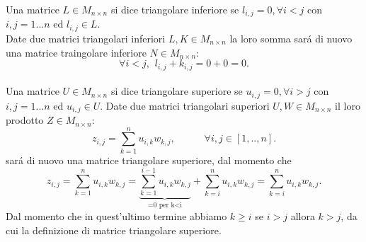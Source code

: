 Una matrice \( L \in M_{n \times n} \) si dice triangolare inferiore se \( l_{i,j}=0, \forall i<j \) con \(i,j = 1...n \) ed \( l_{i,j} \in L \).
\\
Date due matrici triangolari inferiori \( L,K \in M_{n \times n} \) la loro somma sar\'a di nuovo una matrice traingolare inferiore \( N \in M_{n \times n} \):
\[
 \forall i<j, \hspace{5pt} l_{i,j} + k_{i,j} = 0 + 0 = 0.
\]
\\
Una matrice \( U \in M_{n \times n} \) si dice triangolare superiore se \( u_{i,j}=0, \forall i>j \) con \(i,j = 1...n \) ed \( u_{i,j} \in U \).
Date due matrici triangolari superiori  \( U,W \in M_{n \times n} \)  il loro prodotto  \( Z \in M_{n \times n} \):
\[
z_{i,j} = \sum_{k=1}^n u_{i,k} w_{k,j}, \hspace{35pt} \forall i,j \in [1,..,n].
\]
sar\'a di nuovo una matrice triangolare superiore, dal momento che
\[
z_{i,j} =  \sum_{k=1}^n u_{i,k} w_{k,j} =  \underbrace{ \sum_{k=1}^{i-1} u_{i,k} w_{k,j} }_\text{=0 per k<i}  + \sum_{k=i}^n u_{i,k} w_{k,j} = \sum_{k=i}^n u_{i,k} w_{k,j}.
\]
Dal momento che in quest'ultimo termine abbiamo \( k \geq i \) se \( i>j \) allora \( k>j \), da cui la definizione di matrice triangolare superiore.
